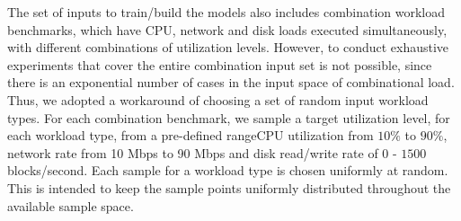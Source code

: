 
% 

% 
% 


The set of inputs to train/build the models also includes 
combination workload benchmarks, which have CPU, network and disk
loads executed simultaneously, with different combinations of 
utilization levels.
However, to conduct exhaustive experiments that cover the
entire combination input set is not possible, since there is an
exponential number of cases in the input space of combinational load.
Thus, we adopted a workaround of choosing a set of random input 
workload types. 
For each combination benchmark, we sample a target utilization level, for 
each workload type, from a pre-defined range\textemdash{}CPU utilization from $10\%$ to 
$90\%$, network rate from 10 Mbps to 90 Mbps and disk read/write rate
of $0$ - $1500$ blocks/second. Each sample for a workload type is chosen
uniformly at random. 
This is intended to keep the sample points
uniformly distributed throughout the available sample space. 

